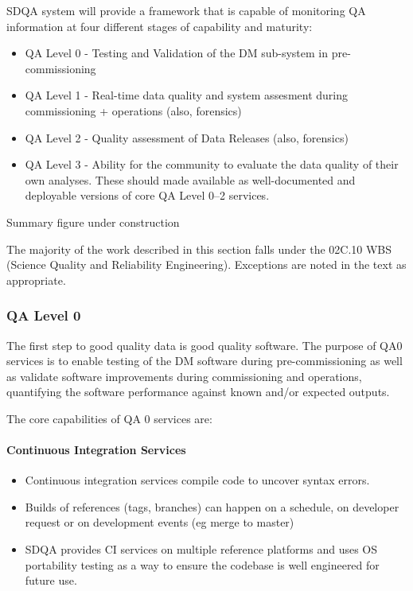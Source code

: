 SDQA system will provide a framework that is capable of monitoring QA
information at four different stages of capability and maturity:

\begin{itemize}
\item QA Level 0 - Testing and Validation of the DM sub-system in pre-commissioning 
\item QA Level 1 - Real-time data quality and system assesment during commissioning + operations (also, forensics)
\item QA Level 2 - Quality assessment of Data Releases (also, forensics) 
\item QA Level 3 - Ability for the community to evaluate the data quality of their own analyses. These should made available as well-documented and deployable versions of core QA Level 0--2 services. 
\end{itemize}

\begin{note}
Summary figure under construction
\end{note}

The majority of the work described in this section falls under the
02C.10 WBS (Science Quality and Reliability Engineering). Exceptions
are noted in the text as appropriate.

\subsubsection{QA Level 0}

The first step to good quality data is good quality software. The
purpose of QA0 services is to enable testing of the DM software during
pre-commissioning as well as validate software improvements during
commissioning and operations, quantifying the software performance
against known and/or expected outputs.

The core capabilities of QA 0 services are:

\paragraph{Continuous Integration Services}
\label{sec:qaCI}
\begin{itemize}

\item Continuous integration services compile code to uncover syntax errors.

\item Builds of references (tags, branches) can happen on a schedule, on developer request or on development events (eg merge to master)

\item SDQA provides CI services on multiple reference platforms and uses OS portability testing as a way to ensure the codebase is well engineered for future use. 

\end{itemize}

